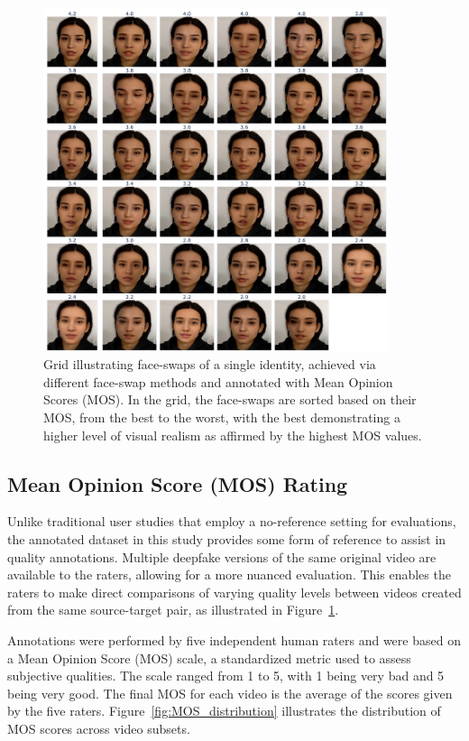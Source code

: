 \documentclass[a4paper,12pt,openright]{book}
\begin{document}
\begin{figure}[H]
    \centering
    \includegraphics[width=0.9\textwidth]{images/newplot.png}
    \caption{Grid illustrating face-swaps of a single identity, achieved via different face-swap methods and annotated with Mean Opinion Scores (MOS). In the grid, the face-swaps are sorted based on their MOS, from the best to the worst, with the best demonstrating a higher level of visual realism as affirmed by the highest MOS values.}
    \label{fig:face-swap-example}
\end{figure}



\subsection{Mean Opinion Score (MOS) Rating}

Unlike traditional user studies that employ a no-reference setting for evaluations, the annotated dataset in this study provides some form of reference to assist in quality annotations. Multiple deepfake versions of the same original video are available to the raters, allowing for a more nuanced evaluation. This enables the raters to make direct comparisons of varying quality levels between videos created from the same source-target pair, as illustrated in Figure~\ref{fig:face-swap-example}. 

Annotations were performed by five independent human raters and were based on a Mean Opinion Score (MOS) scale, a standardized metric used to assess subjective qualities. The scale ranged from 1 to 5, with 1 being very bad and 5 being very good. The final MOS for each video is the average of the scores given by the five raters. Figure~\ref{fig:MOS_distribution} illustrates the distribution of MOS scores across video subsets.
\end{document}

